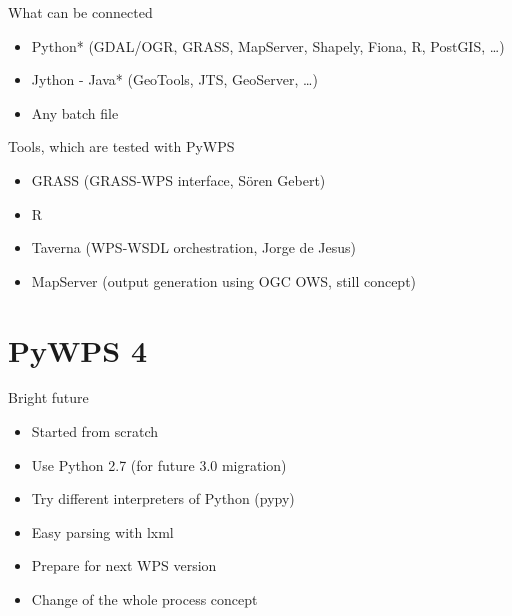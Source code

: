 \documentclass[xcolor=dvipsnames]{beamer}
\begin{document}
\begin{frame}{What can be connected}
\begin{itemize}
    \item Python* (GDAL/OGR, GRASS, MapServer, Shapely, Fiona, R, PostGIS, \dots)
    \item Jython - Java* (GeoTools, JTS, GeoServer, \dots)
    \item Any batch file
\end{itemize}
\end{frame}

\begin{frame}{Tools, which are tested with PyWPS}
\begin{itemize}
    \item GRASS (GRASS-WPS interface, Sören Gebert)
    \item R
    \item Taverna (WPS-WSDL orchestration, Jorge de Jesus)
    \item MapServer (output generation using OGC OWS, still concept)
\end{itemize}
\end{frame}

\section{PyWPS 4}

\begin{frame}{Bright future}
\begin{itemize}
    \item Started from scratch
    \item Use Python 2.7 (for future 3.0 migration)
    \item Try different interpreters of Python (pypy)
    \item Easy parsing with lxml
    \item Prepare for next WPS version
    \item Change of the whole process concept
\end{itemize}
\end{frame}
\end{document}
